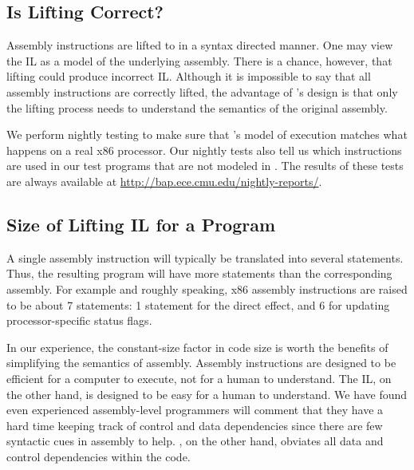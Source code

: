 \subsection{Is Lifting Correct?}

Assembly instructions are lifted to \bap in a syntax directed manner.
One may view the \bap IL as a model of the underlying assembly.  There
is a chance, however, that lifting could produce incorrect
IL. Although it is impossible to say that all assembly instructions
are correctly lifted, the advantage of \bap's design is that only the
lifting process needs to understand the semantics of the original
assembly.

We perform nightly testing to make sure that \bap's model of execution
matches what happens on a real x86 processor.  Our nightly tests also
tell us which instructions are used in our test programs that are not
modeled in \bap.  The results of these tests are always available at
\url{http://bap.ece.cmu.edu/nightly-reports/}.

\subsection{Size of Lifting IL for a Program}

A single assembly instruction will typically be translated into
several \bap statements. Thus, the resulting \bap program will have
more statements than the corresponding assembly.  For example and
roughly speaking, x86 assembly instructions are raised to be about 7
\bap statements: 1 \bap statement for the direct effect, and 6 for
updating processor-specific status flags.

In our experience, the constant-size factor in code size is worth the
benefits of simplifying the semantics of assembly.  Assembly
instructions are designed to be efficient for a computer to execute,
not for a human to understand. The IL, on the other hand, is designed
to be easy for a human to understand.  We have found even experienced
assembly-level programmers will comment that they have a hard time
keeping track of control and data dependencies since there are few
syntactic cues in assembly to help. \bap, on the other hand, obviates
all data and control dependencies within the code. 

